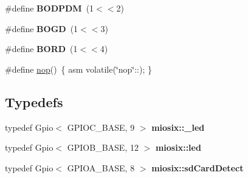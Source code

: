 \begin{DoxyCompactItemize}
\item 
\hypertarget{group___hardware_ga06751e6c91351c6b774399765c9290bd}{\#define {\bfseries B\-O\-D\-P\-D\-M}~(1$<$$<$2)}\label{group___hardware_ga06751e6c91351c6b774399765c9290bd}

\item 
\hypertarget{group___hardware_ga9b992d1fc2e8787a9e3f037c72ed7073}{\#define {\bfseries B\-O\-G\-D}~(1$<$$<$3)}\label{group___hardware_ga9b992d1fc2e8787a9e3f037c72ed7073}

\item 
\hypertarget{group___hardware_ga7713253fff921baf139d31e24d04fe83}{\#define {\bfseries B\-O\-R\-D}~(1$<$$<$4)}\label{group___hardware_ga7713253fff921baf139d31e24d04fe83}

\item 
\#define \hyperlink{group___hardware_ga6c92c29fa8e83ab85e05543010e10d7c}{nop}()~\{ asm volatile(\char`\"{}nop\char`\"{}\-::); \}
\end{DoxyCompactItemize}
\subsection*{Typedefs}
\begin{DoxyCompactItemize}
\item 
\hypertarget{group___hardware_gaf48f3c548e2fa07d8cc734aedbd23619}{typedef Gpio$<$ G\-P\-I\-O\-C\-\_\-\-B\-A\-S\-E, 9 $>$ {\bfseries miosix\-::\-\_\-led}}\label{group___hardware_gaf48f3c548e2fa07d8cc734aedbd23619}

\item 
\hypertarget{group___hardware_ga1d025d1f4223e6fb914b47c303438953}{typedef Gpio$<$ G\-P\-I\-O\-B\-\_\-\-B\-A\-S\-E, 12 $>$ {\bfseries miosix\-::led}}\label{group___hardware_ga1d025d1f4223e6fb914b47c303438953}

\item 
\hypertarget{group___hardware_ga7fd1aeff5d1c25fee0b6c25a31fbe014}{typedef Gpio$<$ G\-P\-I\-O\-A\-\_\-\-B\-A\-S\-E, 8 $>$ {\bfseries miosix\-::sd\-Card\-Detect}}\label{group___hardware_ga7fd1aeff5d1c25fee0b6c25a31fbe014}

\end{DoxyCompactItemize}
